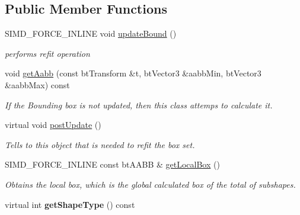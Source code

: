 \subsection*{Public Member Functions}
\begin{DoxyCompactItemize}
\item 
S\+I\+M\+D\+\_\+\+F\+O\+R\+C\+E\+\_\+\+I\+N\+L\+I\+NE void \hyperlink{classbtGImpactShapeInterface_acb26c2d7a2aecabd06b996b72b848492}{update\+Bound} ()
\begin{DoxyCompactList}\small\item\em performs refit operation \end{DoxyCompactList}\item 
void \hyperlink{classbtGImpactShapeInterface_a03644dc230664957e43ed49b4a319d64}{get\+Aabb} (const bt\+Transform \&t, bt\+Vector3 \&aabb\+Min, bt\+Vector3 \&aabb\+Max) const
\begin{DoxyCompactList}\small\item\em If the Bounding box is not updated, then this class attemps to calculate it. \end{DoxyCompactList}\item 
\mbox{\label{classbtGImpactShapeInterface_ac430754948ac92d6f70b81e88416c96a}} 
virtual void \hyperlink{classbtGImpactShapeInterface_ac430754948ac92d6f70b81e88416c96a}{post\+Update} ()
\begin{DoxyCompactList}\small\item\em Tells to this object that is needed to refit the box set. \end{DoxyCompactList}\item 
\mbox{\label{classbtGImpactShapeInterface_ad4f12ac5c91bf67349109aecdec65455}} 
S\+I\+M\+D\+\_\+\+F\+O\+R\+C\+E\+\_\+\+I\+N\+L\+I\+NE const bt\+A\+A\+BB \& \hyperlink{classbtGImpactShapeInterface_ad4f12ac5c91bf67349109aecdec65455}{get\+Local\+Box} ()
\begin{DoxyCompactList}\small\item\em Obtains the local box, which is the global calculated box of the total of subshapes. \end{DoxyCompactList}\item 
\mbox{\label{classbtGImpactShapeInterface_ac17994be6ed4358890b017d67c335df0}} 
virtual int {\bfseries get\+Shape\+Type} () const
\item 

\end{DoxyCompactItemize}
